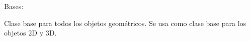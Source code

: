 \documentclass[letterpaper,10pt,spanish]{sphinxmanual}
\begin{document}

\begin{fulllineitems}
\label{\detokenize{pr8:pr8.3.ObjetoGeometrico}}
\pysigstartsignatures
{}
\pysigstopsignatures
\sphinxAtStartPar
Bases: 

\sphinxAtStartPar
Clase base para todos los objetos geométricos.
Se usa como clase base para los objetos 2D y 3D.

\end{fulllineitems}

\end{document}
